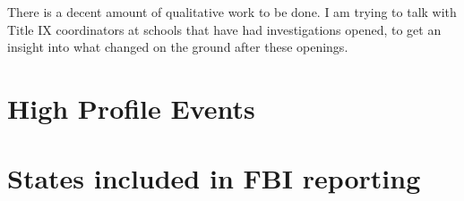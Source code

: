\documentclass[AER,draftmode]{AEA}
\begin{document}
There is a decent amount of qualitative work to be done. I am trying to talk with Title IX coordinators at schools that have had investigations opened, to get an insight into what changed on the ground after these openings.

\clearpage




\clearpage
\appendix

\chapter{High Profile Events}

\chapter{States included in FBI reporting}
\end{document}
